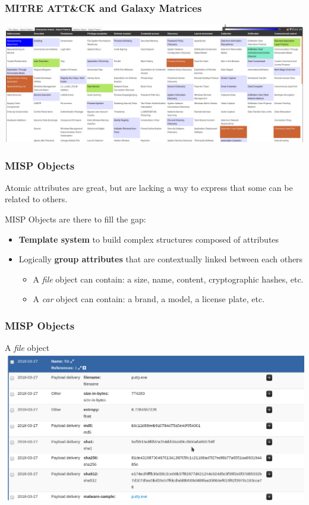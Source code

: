 \begin{frame}
    \frametitle{MITRE ATT\&CK and Galaxy Matrices}
    \includegraphics[width=1.0\linewidth]{pictures/attack.png}
\end{frame}

\begin{frame}
    \frametitle{MISP Objects}
    Atomic attributes are great, but are lacking a way to express that some can be related to others.

    \vspace{12px}
    MISP Objects are there to fill the gap:
    \begin{itemize}
        \item \textbf{Template system} to build complex structures composed of attributes
        \item Logically \textbf{group attributes} that are contextually linked between each others
        \begin{itemize}
            \item A \textit{file} object can contain: a size, name, content, cryptographic hashes, etc.
            \item A \textit{car} object can contain: a brand, a model, a license plate, etc.
        \end{itemize}
    \end{itemize}
\end{frame}

\begin{frame}
    \frametitle{MISP Objects}
    A \textit{file} object
    \includegraphics[width=1.0\linewidth]{pictures/object.png}
\end{frame}

